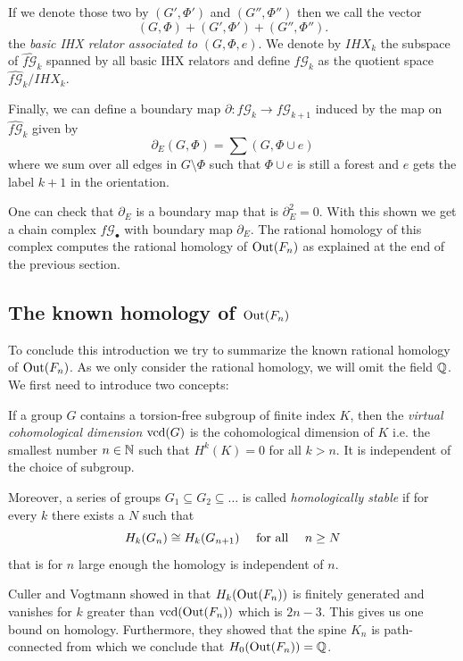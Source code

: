 If we denote those two by $(G',\Phi')$ and  $(G'',\Phi'')$ then we call the vector
\[
	(G,\Phi) + (G',\Phi') + (G'',\Phi'')
.\] 
the \emph{basic IHX relator associated to} $(G,\Phi,e)$. 
We denote by $IHX_{k}$ the subspace of $\widehat{f\mathcal{G}}_{k}$ spanned by all basic IHX relators
and define $f\mathcal{G}_{k}$ as the quotient space $\widehat{f\mathcal{G}}_{k} / IHX_{k}$.

Finally, we can define a boundary map  $\partial: f\mathcal{G}_{k} \to f\mathcal{G}_{k+1}$ induced by the map on $\widehat{f \mathcal{G}}_{k}$ given by
\[
	\partial_{E}(G,\Phi) = \sum (G,\Phi \cup e)
\] 
where we sum over all edges in $G \setminus \Phi$ such that $\Phi \cup e$ is still a forest and 
$e$ gets the label $k+1$ in the orientation.

One can check that $\partial_{E}$ is a boundary map that is $\partial_{E}^2 = 0$.
With this shown we get a chain complex $f\mathcal{G}_{\bullet}$ with boundary map $\partial_{E}$.
The rational homology of this complex computes the rational homology of $\operatorname{Out}(F_{n})$ as
explained at the end of the previous section.

\subsection{The known homology of \texorpdfstring{\boldmath$\operatorname{Out}(F_{n})$}{Out(Fn)}}
To conclude this introduction we try to summarize the known rational homology of $\operatorname{Out}(F_{n})$.
As we only consider the rational homology, we will omit the field $\mathbb{Q}$.
We first need to introduce two concepts:
\begin{definition}
	If a group $G$ contains a torsion-free subgroup of finite index $K$, then the \emph{virtual cohomological dimension} $\operatorname{vcd}(G)$
	is the cohomological dimension of $K$ i.e. the smallest number $n \in \mathbb{N}$ such that $H^{k}(K) = 0$ for all $k > n$. It is independent of the choice of subgroup.

Moreover, a series of groups $G_1 \subseteq G_2 \subseteq \ldots$ is called \emph{homologically stable} if for every $k$ 
there exists a $N$ such that 
\[
	H_{k}(G_{n}) \cong H_{k}(G_{n+1}) \qq{ for all } n \geq N
\]
that is for $n$ large enough the homology is independent of  $n$.
\end{definition}

Culler and Vogtmann showed in \cite{vogtmann86} that $H_{k}(\operatorname{Out}(F_{n}))$ is finitely generated and vanishes for $k$ greater
than $\operatorname{vcd}(\operatorname{Out}(F_{n}))$ which is $2n -3$. This gives us one bound on homology.
Furthermore, they showed that the spine $K_{n}$ is path-connected from which we conclude that $H_0(\operatorname{Out}(F_{n})) = \mathbb{Q}$.

